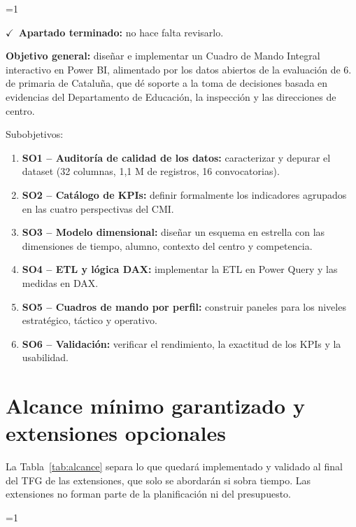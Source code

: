 \documentclass[12pt, a4paper, oneside]{report}
\newcommand{\mostrarterminados}{1}
\newenvironment{revisado}
  {\ifnum\mostrarterminados=1\relax\begin{cajarevisada}\noindent\colorbox{verdeterminado}{\parbox{\dimexpr\linewidth-2\fboxsep\relax}{\small$\checkmark$\ \textbf{Apartado terminado:} no hace falta revisarlo.}}\par\medskip\fi}
  {\ifnum\mostrarterminados=1\relax\end{cajarevisada}\fi}
\begin{document}
\begin{revisado}
\textbf{Objetivo general:} diseñar e implementar un Cuadro de Mando Integral interactivo en Power BI, alimentado por los datos abiertos de la evaluación de 6.\textordmasculine{} de primaria de Cataluña, que dé soporte a la toma de decisiones basada en evidencias del Departamento de Educación, la inspección y las direcciones de centro.

Subobjetivos:
\begin{enumerate}
    \item \textbf{SO1 -- Auditoría de calidad de los datos:} caracterizar y depurar el dataset (32 columnas, 1,1 M de registros, 16 convocatorias).
    \item \textbf{SO2 -- Catálogo de KPIs:} definir formalmente los indicadores agrupados en las cuatro perspectivas del CMI.
    \item \textbf{SO3 -- Modelo dimensional:} diseñar un esquema en estrella con las dimensiones de tiempo, alumno, contexto del centro y competencia.
    \item \textbf{SO4 -- ETL y lógica DAX:} implementar la ETL en Power Query y las medidas en DAX.
    \item \textbf{SO5 -- Cuadros de mando por perfil:} construir paneles para los niveles estratégico, táctico y operativo.
    \item \textbf{SO6 -- Validación:} verificar el rendimiento, la exactitud de los KPIs y la usabilidad.
\end{enumerate}

\section{Alcance mínimo garantizado y extensiones opcionales}
\label{sec:alcance_min}
La Tabla~\ref{tab:alcance} separa lo que quedará implementado y validado al final del TFG de las extensiones, que solo se abordarán si sobra tiempo. Las extensiones no forman parte de la planificación ni del presupuesto.


\end{revisado}
\end{document}
